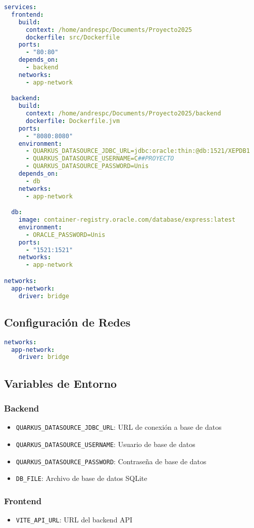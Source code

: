 \documentclass[12pt,a4paper]{article}
\begin{document}
\begin{lstlisting}[language=yaml]
services:
  frontend:
    build:
      context: /home/andrespc/Documents/Proyecto2025
      dockerfile: src/Dockerfile
    ports:
      - "80:80"
    depends_on:
      - backend
    networks:
      - app-network

  backend:
    build:
      context: /home/andrespc/Documents/Proyecto2025/backend
      dockerfile: Dockerfile.jvm
    ports:
      - "8080:8080"
    environment:
      - QUARKUS_DATASOURCE_JDBC_URL=jdbc:oracle:thin:@db:1521/XEPDB1
      - QUARKUS_DATASOURCE_USERNAME=C##PROYECTO
      - QUARKUS_DATASOURCE_PASSWORD=Unis
    depends_on:
      - db
    networks:
      - app-network

  db:
    image: container-registry.oracle.com/database/express:latest
    environment:
      - ORACLE_PASSWORD=Unis
    ports:
      - "1521:1521"
    networks:
      - app-network

networks:
  app-network:
    driver: bridge
\end{lstlisting}

\subsection{Configuración de Redes}
\begin{lstlisting}[language=yaml]
networks:
  app-network:
    driver: bridge
\end{lstlisting}

\subsection{Variables de Entorno}

\subsubsection{Backend}
\begin{itemize}
    \item \texttt{QUARKUS\_DATASOURCE\_JDBC\_URL}: URL de conexión a base de datos
    \item \texttt{QUARKUS\_DATASOURCE\_USERNAME}: Usuario de base de datos
    \item \texttt{QUARKUS\_DATASOURCE\_PASSWORD}: Contraseña de base de datos
    \item \texttt{DB\_FILE}: Archivo de base de datos SQLite
\end{itemize}

\subsubsection{Frontend}
\begin{itemize}
    \item \texttt{VITE\_API\_URL}: URL del backend API
\end{itemize}
\end{document}
